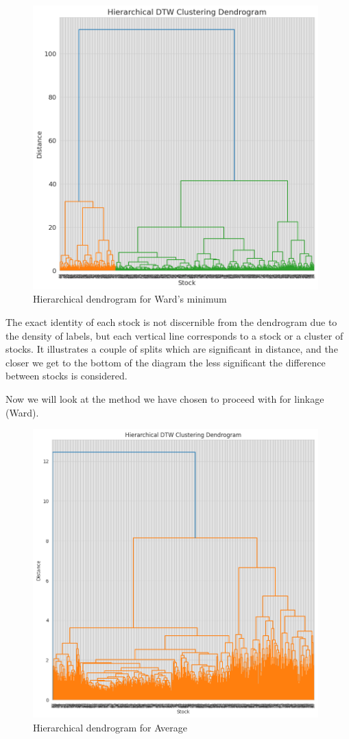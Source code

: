 \documentclass[11pt]{article}
\begin{document}
\begin{figure}[H]
\centering
\includegraphics[width=11cm]{img/dendogram.png} 
\caption{Hierarchical dendrogram for Ward's minimum}
\label{fig:kernel_dendrogram}
\end{figure}

The exact identity of each stock is not discernible from the dendrogram due to the density of labels, but each vertical line corresponds to a stock or a cluster of stocks. It illustrates a couple of splits which are significant in distance, and the closer we get to the bottom of the diagram the less significant the difference between stocks is considered. 

Now we will look at the method we have chosen to proceed with for linkage (Ward).

\begin{figure}[H]
\centering
\label{fig:kernel_average_dendrogram}
\includegraphics[width=11cm]{img/dendogram_average.png} 
\caption{Hierarchical dendrogram for Average}
\end{figure}
\end{document}
